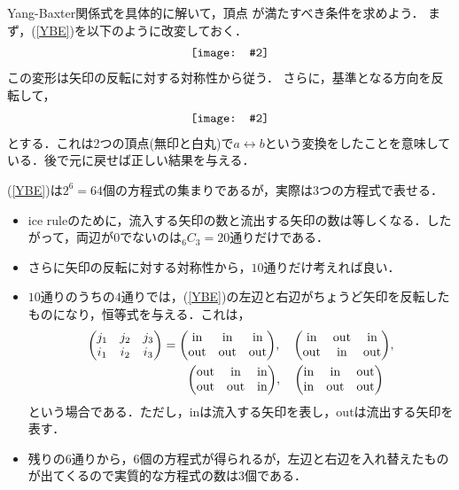 \documentclass[dvipdfmx,9pt]{beamer}
\newcommand\Includegraphics[2][]{\vcenter{\hbox{\texttt{[image: \#2]}}}}
\numberwithin{equation}{section}
\begin{document}
\begin{frame}
    Yang-Baxter関係式を具体的に解いて，頂点
    が満たすべき条件を求めよう．
    まず，(\ref{YBE})を以下のように改変しておく．
    \begin{align}
        \Includegraphics[scale = 0.15]{YBE_rotate.pdf}
    \end{align}
    この変形は矢印の反転に対する対称性から従う．
    さらに，基準となる方向を反転して，
    \begin{align}
        \Includegraphics[scale = 0.15]{YBE_modified.pdf}
    \end{align}
    とする．これは2つの頂点(無印と白丸)で$a \leftrightarrow b$という変換をしたことを意味している．後で元に戻せば正しい結果を与える．
\end{frame}
\begin{frame}
    (\ref{YBE})は$2^6 = 64$個の方程式の集まりであるが，実際は3つの方程式で表せる．
    \begin{itemize}
        \item ice ruleのために，流入する矢印の数と流出する矢印の数は等しくなる．したがって，両辺が$0$でないのは${}_6 C_3 = 20$通りだけである．
        \item さらに矢印の反転に対する対称性から，$10$通りだけ考えれば良い．
        \item     $10$通りのうちの$4$通りでは，(\ref{YBE})の左辺と右辺がちょうど矢印を反転したものになり，恒等式を与える．これは，
        \begin{align}
            \mqty(j_1 & j_2 & j_3 \\ i_1 & i_2 & i_3) &\nonumber
            = \mqty(\mathrm{in} & \mathrm{in} & \mathrm{in} \\ \mathrm{out} &\mathrm{out} & \mathrm{out}),
            \quad
            \mqty(\mathrm{in} & \mathrm{out} & \mathrm{in} \\ \mathrm{out} &\mathrm{in} & \mathrm{out}),
            \\ &\qquad
            \mqty(\mathrm{out} & \mathrm{in} & \mathrm{in} \\ \mathrm{out} &\mathrm{out} & \mathrm{in}),
            \quad
            \mqty(\mathrm{in} & \mathrm{in} & \mathrm{out} \\ \mathrm{in} &\mathrm{out} & \mathrm{out})
        \end{align}
        という場合である．ただし，$\mathrm{in}$は流入する矢印を表し，$\mathrm{out}$は流出する矢印を表す．
        \item 残りの$6$通りから，$6$個の方程式が得られるが，左辺と右辺を入れ替えたものが出てくるので実質的な方程式の数は$3$個である．
    \end{itemize}
\end{frame}
\end{document}
